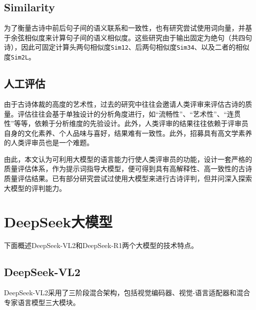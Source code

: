 \subsection{Similarity}
为了衡量古诗中前后句子间的语义联系和一致性，也有研究尝试使用词向量，并基于余弦相似度来计算句子间的语义相似度。这些研究由于输出固定为绝句（共四句诗），因此可固定计算头两句相似度\verb|Sim12|、后两句相似度\verb|Sim34|、以及二者的相似度\verb|Sim2L|。

\subsection{人工评估}

由于古诗体裁的高度的艺术性，过去的研究中往往会邀请人类评审来评估古诗的质量。评估往往会基于单独设计的分析角度进行，如“流畅性”、“艺术性”、“连贯性”等等，依赖于分析维度的先验设计。此外，人类评审的结果往往依赖于评审员自身的文化素养、个人品味与喜好，结果难有一致性。此外，招募具有高文学素养的人类评审员也是一个难题。

由此，本文认为可利用大模型的语言能力行使人类评审员的功能，设计一套严格的质量评估体系，作为提示词指导大模型，便可得到具有高解释性、高一致性的古诗质量评估结果。已有部分研究尝试过使用大模型来进行古诗评判，但并问深入探索大模型的评判能力。


\section{DeepSeek大模型}

下面概述DeepSeek-VL2和DeepSeek-R1两个大模型的技术特点。

\subsection{DeepSeek-VL2}

DeepSeek-VL2采用了三阶段混合架构，包括视觉编码器、视觉-语言适配器和混合专家语言模型三大模块。


